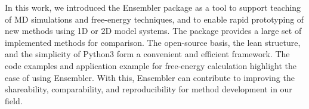 In this work, we introduced the Ensembler package as a tool to support teaching of MD simulations and free-energy techniques, and to enable rapid prototyping of new methods using 1D or 2D model systems. The package provides a large set of implemented methods for comparison. The open-source basis, the lean structure, and the simplicity of Python3 form a convenient and efficient framework. The code examples and application example for free-energy calculation highlight the ease of using Ensembler. With this, Ensembler can contribute to improving the shareability, comparability, and reproducibility for method development in our field.